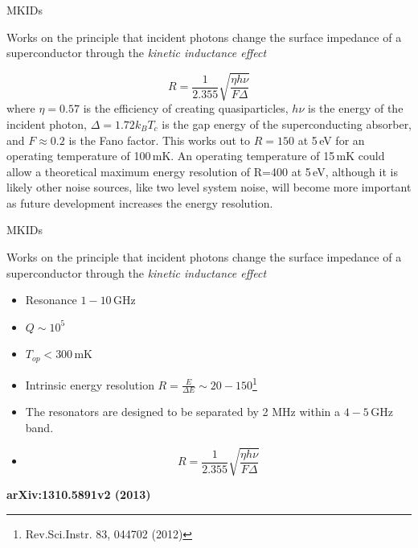 \documentclass[ignorenonframetext,12pt]{beamer}
\begin{document}
\begin{frame}{MKIDs}
				\begin{exampleblock}{}
								Works on the principle that incident photons change the surface
								impedance of a superconductor through the \textit{kinetic
								inductance effect}
				\end{exampleblock}
												\begin{equation}
																R = \frac{1}{2.355}\sqrt{\frac{\eta h \nu}{F
																\Delta}}
												\end{equation}
				where $\eta = 0.57$ is the efficiency of creating quasiparticles, $h\nu$
				is the energy of the incident photon, $\Delta = 1.72k_BT_c$ is the gap
				energy of the superconducting absorber, and $F \approx 0.2$ is the Fano
				factor. This works out to $R=150$ at 5\,eV for an operating temperature
				of 100\,mK. An operating temperature of 15\,mK could allow a theoretical
				maximum energy resolution of R=400 at 5\,eV, although it is likely other
				noise sources, like two level system noise, will become more important
				as future development increases the energy resolution.

\end{frame}
\begin{frame}{MKIDs}
				\begin{exampleblock}{}
								Works on the principle that incident photons change the surface
								impedance of a superconductor through the \textit{kinetic
								inductance effect}
				\end{exampleblock}
				\begin{itemize}
								\item Resonance  $1-10\,\text{GHz}$ 
								\item $Q \sim 10^5$
								\item $T_{op} < 300\,\text{mK}$
								\item Intrinsic energy resolution $R = \frac{E}{\Delta E} \sim
												20-150$\footnote{Rev.Sci.Instr. 83, 044702 (2012)}
								\item The resonators are designed to be separated by 2 MHz
												within a $4-5\,\text{GHz}$ band.
								\item 
												\begin{equation}
																R = \frac{1}{2.355}\sqrt{\frac{\eta h \nu}{F
																\Delta}}
												\end{equation}
				\end{itemize}

				\textbf{arXiv:1310.5891v2 (2013)}
\end{frame}
\end{document}
